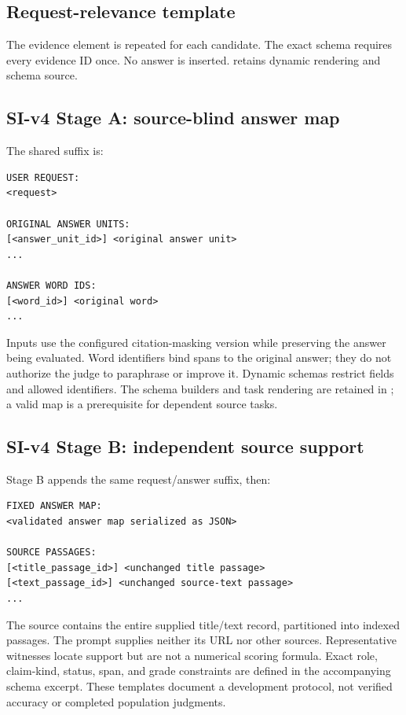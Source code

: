 \subsection{Request-relevance template}

The evidence element is repeated for each candidate. The exact schema requires every evidence ID once. No answer is inserted.  retains dynamic rendering and schema source.

\subsection{SI-v4 Stage A: source-blind answer map}

The shared suffix is:
\begin{lstlisting}
USER REQUEST:
<request>

ORIGINAL ANSWER UNITS:
[<answer_unit_id>] <original answer unit>
...

ANSWER WORD IDS:
[<word_id>] <original word>
...
\end{lstlisting}
Inputs use the configured citation-masking version while preserving the answer being evaluated. Word identifiers bind spans to the original answer; they do not authorize the judge to paraphrase or improve it. Dynamic schemas restrict fields and allowed identifiers. The schema builders and task rendering are retained in ; a valid map is a prerequisite for dependent source tasks. 

\subsection{SI-v4 Stage B: independent source support}

Stage B appends the same request/answer suffix, then:
\begin{lstlisting}
FIXED ANSWER MAP:
<validated answer map serialized as JSON>

SOURCE PASSAGES:
[<title_passage_id>] <unchanged title passage>
[<text_passage_id>] <unchanged source-text passage>
...
\end{lstlisting}
The source contains the entire supplied title/text record, partitioned into indexed passages. The prompt supplies neither its URL nor other sources. Representative witnesses locate support but are not a numerical scoring formula. Exact role, claim-kind, status, span, and grade constraints are defined in the accompanying schema excerpt. These templates document a development protocol, not verified accuracy or completed population judgments.

